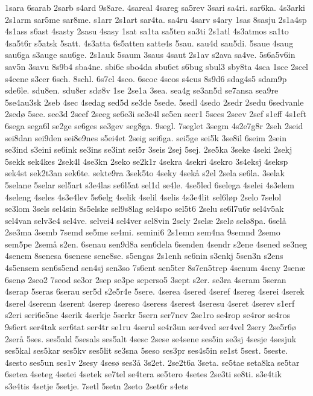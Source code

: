 {1sara
6sarab
2sarb
s4ard
9s8are.
4sareal
4sareg
sa5rev
3sari
sa4ri.
sar6ka.
4s3arki
2s1arm
sar5me
sar8me.
s1arr
2s1art
sar4ta.
sa4ru
4sarv
s4ary
1sas
8sasju
2s1a4sp
4s1ass
s6ast
4sasty
2sasu
4sasy
1sat
sa1ta
sa5ten
sa3ti
2s1atl
4s3atmos
sa1to
4sa5t6r
s5atsk
5satt.
4s3atta
6s5atten
satte4s
5sau.
sau4d
sau5di.
5saue
4saug
sau6ga
s3auge
sau6ge.
2s1auk
5saum
3saus
4saut
2s1av
s2ava
sa4ve.
5s6a5v6in
sav5n
3savu
8s9b4
sba4ne.
sbi6e
sbo4da
sbu6et
s6bug
sbul3
sby8ta
4sca
1sce
2scel
s4cene
s3cer
6sch.
8schl.
6s7cl
4sco.
6scoc
4scos
s4cus
8s9d6
sdag4s5
sdam9p
sde6le.
sdu8en.
sdu8er
sdø8v
1se
2se1a
3sea.
sea4g
se3an5d
se7ansa
sea9re
5se4au3sk
2seb
4sec
4sedag
sed5d
se3de
5sede.
5sedl
4sedo
2sedr
2sedu
6sedvanle
2sedø
5see.
see3d
2seef
2seeg
se6e3i
se3e4l
se5en
seer1
5sees
2seev
2sef
s1eff
4s1eft
6sega
sega6l
se2ge
se6ges
se3gev
seg8ga.
9segl.
7seglet
3segm
4s2e7g8r
2seh
2seid
sei8dan
sei9den
sei8e9nes
s5ei4et
2seig
sei6ga.
sei5ge
sei5k
3se8il
6seim
2sein
se3ind
s3eini
se6ink
se3ins
se3int
sei5r
3seis
2sej
5sej.
2se5ka
3seke
4seki
2sekj
5sekk
sek4kes
2sek4l
4se3kn
2seko
se2k1r
4sekra
4sekri
4sekro
3s4eksj
4seksp
sek4st
sek2t3an
sek6te.
sekte9ra
3sek5to
4seky
4sekå
s2el
2sela
se6la.
3selak
5selane
5selar
sel5art
s3e4las
se6l5at
sel1d
se4le.
4se5led
6selega
4selei
4s3elem
4seleng
4seles
4s3e4lev
5s6elg
4selik
4selil
4selis
4s3e4lit
sel6løp
2selo
7selol
se3lom
3sels
sel4sin
8s5elske
sel9s8lag
sel4spo
sel5t6
2selu
se6l7u6r
sel4v5ak
sel4van
selv3e4
sel4ve.
selvei4
sel4ver
sel8vin
2sely
2selæ
2selø
selø8pa.
6selå
2se3ma
3semb
7semd
se5me
se4mi.
semini6
2s1emn
sem4na
9semnd
2semo
sem5pe
2semå
s2en.
6senau
sen9d8a
sen6dela
6senden
4sendr
s2ene
4sened
se3neg
4senem
8senesa
6senese
sene8se.
s5engas
2s1enh
se6nin
s3enkj
5sen3n
s2ens
4s5ensem
sen6s5end
sen4sj
sen3so
7s6ent
sen5ter
8s7en5trep
4senum
4seny
2senæ
6senø
2seo2
7seod
se3or
2sep
se3pe
seperso5
3sept
s2er.
se3ra
4seram
5seran
4serap
5seras
6serau
ser5d
s2e5r4e
5sere.
4serea
4sered
4seref
4sereg
4serei
4serek
4serel
4serenn
4serent
4serep
4sereso
4seress
4serest
4seresu
4seret
4serev
s1erf
s2eri
seri6e5ne
4serik
4serkje
5serkr
5sern
ser7nev
2se1ro
se4rop
se4ror
se4ros
9s6ert
ser4tak
ser6tat
ser4tr
se1ru
4serul
se4r3un
ser4ved
ser4vel
2sery
2se5r6ø
2serå
5ses.
ses5ald
5sesals
ses5alt
4sesc
2sese
se4sene
ses5in
se3sj
4sesje
4sesjuk
ses5kal
ses5kar
ses5kv
ses5lit
se3sna
5seso
ses3pr
ses4s5in
se1st
5sest.
5seste.
4sesto
ses5un
ses1v
2sesy
4sesø
ses3å
3s2et.
2se2t6a
3seta.
se5tae
seta8ka
se5tar
6setea
4seteg
4setei
4setek
se7tel
se4tera
se5tero
4setes
2se3ti
se8ti.
s3e4tik
s3e4tis
4setje
5setje.
7setl
5setn
2seto
2set6r
s4ets
}
